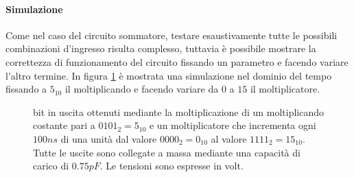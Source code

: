 	\paragraph{Simulazione} Come nel caso del circuito sommatore, testare esaustivamente tutte le possibili combinazioni d'ingresso risulta complesso, tuttavia è possibile mostrare la correttezza di funzionamento del circuito fissando un parametro e facendo variare l'altro termine. In figura \ref{fig:molt:sim} è mostrata una simulazione nel dominio del tempo fissando a $5_{10}$ il moltiplicando e facendo variare da $0$ a $15$ il moltiplicatore.
	
	\begin{figure}[bht]
		\centering
		
		\caption{bit in uscita ottenuti mediante la moltiplicazione di un moltiplicando costante pari a $0101_2=5_{10}$ e un moltiplicatore che incrementa ogni $100ns$ di una unità dal valore $0000_2=0_{10}$ al valore $1111_2=15_{10}$. Tutte le uscite sono collegate a massa mediante una capacità di carico di $0.75pF$. Le tensioni sono espresse in volt. }
		\label{fig:molt:sim}
	\end{figure}
	
	
	
	
	